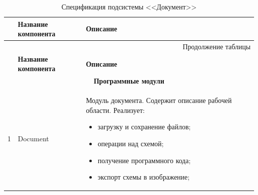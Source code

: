 \small
\singlespacing
\begin{longtable}[h]{|p{}|p{}|p{}|}
  \caption{Спецификация подсистемы <<Документ>>}
	\\ \hline
	  \textbf{\No}                  &
	  \textbf{Название компонента}  &
	  \textbf{Описание}
	\\ \hline
  \endfirsthead

  \multicolumn{3}{r}{Продолжение таблицы \thetable{}}
  \\ \hline
	  \textbf{\No}                  &
	  \textbf{Название компонента}  &
	  \textbf{Описание}
	\\ \hline
  \endhead

  \multicolumn{3}{|c|}{\textbf{Программные модули}} \\
  \hline
  1 & Document & Модуль документа. Содержит описание рабочей области. Реализует:
  \begin{itemize}[leftmargin=*,nolistsep]
    \item загрузку и сохранение файлов;
    \item операции над схемой;
    \item получение программного кода;
    \item экспорт схемы в изображение;
  \end{itemize} \\ \hline
\end{longtable}
\normalsize
\onehalfspacing

